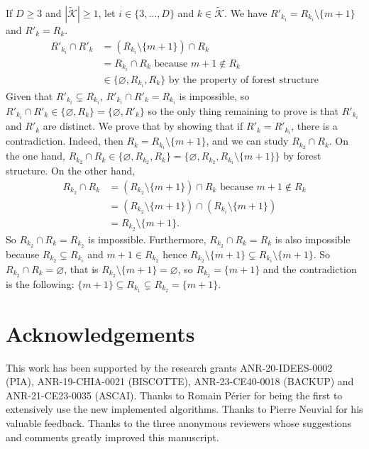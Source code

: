 \documentclass[
  11pt,
  a4paper,
]{article}
\theoremstyle{plain}
\theoremstyle{definition}
\theoremstyle{plain}
\theoremstyle{definition}
\theoremstyle{plain}
\theoremstyle{remark}
\begin{document}
If \(D\geq 3\) and \(|\widetilde{\mathcal{K}}|\geq1\), let
\(i\in\{3,\dotsc, D\}\) and \(k\in\widetilde{\mathcal{K}}\). We have
\(R'_{k_i}=R_{k_i}\setminus\{m+1\}\) and \(R'_k=R_k\). \begin{align*}
R'_{k_i}\cap R'_k&=(R_{k_i}\setminus\{m+1\})\cap R_k \\
&=R_{k_i}\cap R_k \text{ because } m+1\not\in R_k\\
&\in\{\varnothing, R_{k_i}, R_k\} \text{ by the property of forest structure}
\end{align*} Given that \(R'_{k_i}\subsetneq R_{k_i}\),
\(R'_{k_i}\cap R'_k=R_{k_i}\) is impossible, so
\(R'_{k_i}\cap R'_k\in\{\varnothing, R_k\}=\{\varnothing, R'_k\}\) so
the only thing remaining to prove is that \(R'_{k_i}\) and \(R'_k\) are
distinct. We prove that by showing that if \(R'_k = R'_{k_i}\), there is
a contradiction. Indeed, then \(R_k = R_{k_i}\setminus\{m+1\}\), and we
can study \(R_{k_2}\cap R_k\). On the one hand,
\(R_{k_2}\cap R_k\in\{\varnothing, R_{k_2}, R_k\}=\{\varnothing, R_{k_2}, R_{k_i}\setminus\{m+1\}\}\)
by forest structure. On the other hand, \begin{align*}
R_{k_2}\cap R_k&=(R_{k_2}\setminus\{m+1\})\cap R_k \text{ because }m+1\not\in R_k \\
&=(R_{k_2}\setminus\{m+1\})\cap (R_{k_i}\setminus\{m+1\})\\
&=R_{k_2}\setminus\{m+1\}.
\end{align*} So \(R_{k_2}\cap R_k=R_{k_2}\) is impossible. Furthermore,
\(R_{k_2}\cap R_k=R_{k}\) is also impossible because
\(R_{k_2}\subsetneq R_{k_i}\) and \(m+1\in R_{k_2}\) hence
\(R_{k_2}\setminus\{m+1\}\subsetneq R_{k_i}\setminus\{m+1\}\). So
\(R_{k_2}\cap R_k=\varnothing\), that is
\(R_{k_2}\setminus\{m+1\}=\varnothing\), so \(R_{k_2}=\{m+1\}\) and the
contradiction is the following:
\(\{m+1\}\subseteq R_{k_1}\subsetneq R_{k_2}=\{m+1\}\).

\section*{Acknowledgements}\label{acknowledgements}

This work has been supported by the research grants ANR-20-IDEES-0002
(PIA), ANR-19-CHIA-0021 (BISCOTTE), ANR-23-CE40-0018 (BACKUP) and
ANR-21-CE23-0035 (ASCAI). Thanks to Romain Périer for being the first to
extensively use the new implemented algorithms. Thanks to Pierre Neuvial
for his valuable feedback. Thanks to the three anonymous reviewers whose
suggestions and comments greatly improved this manuscript.
\end{document}
